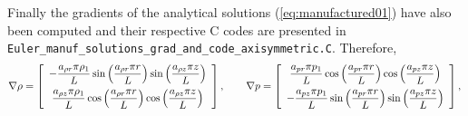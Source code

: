 \documentclass[a4paper,10pt]{article}
\begin{document}
\begin{landscape}
Finally the gradients of the analytical solutions (\ref{eq:manufactured01}) have also been computed and their respective C codes are presented in \\ \texttt{Euler\_manuf\_solutions\_grad\_and\_code\_axisymmetric.C}. Therefore,
\begin{equation*}
\nabla  \rho= \left[ \begin{array}{c}
  -\dfrac{ a_{\rho r} \pi \rho_1 }{L}  \sin\left(\dfrac{a_{\rho r}  \pi  r }{L}\right) \sin\left(\dfrac{a_{\rho z}  \pi  z }{L}\right)\vspace{5pt} \\
   \dfrac{ a_{\rho z}  \pi\rho_1 }{L}\cos\left(\dfrac{a_{\rho r}  \pi  r }{L}\right)  \cos\left(\dfrac{a_{\rho z}  \pi  z }{L}\right)
\end{array} \right],
\qquad
\nabla p = \left[ \begin{array}{c}
   \dfrac{ a_{pr}  \pi p_1}{L}\cos\left(\dfrac{a_{pr}  \pi  r }{L}\right)  \cos\left(\dfrac{a_{pz}  \pi  z }{L}\right)\vspace{5pt} \\
  -\dfrac{ a_{pz}  \pi p_1 }{L} \sin\left(\dfrac{a_{pr}  \pi  r }{L}\right)  \sin\left(\dfrac{a_{pz}  \pi  z }{L}\right)
\end{array} \right], \\
\end{equation*}


\end{landscape}
\end{document}
